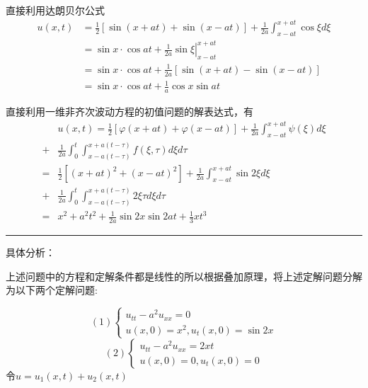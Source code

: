 \begin{questions}
\begin{solution}
直接利用达朗贝尔公式
$$
\begin{aligned}
u(x, t) & =\frac{1}{2}[\sin (x+a t)+\sin (x-a t)]+\frac{1}{2 a} \int_{x-a t}^{x+a t} \cos \xi d \xi \\
& =\sin x \cdot \cos a t+\left.\frac{1}{2 a} \sin \xi\right|_{x-a t} ^{x+a t} \\
& =\sin x \cdot \cos a t+\frac{1}{2 a}[\sin (x+a t)-\sin (x-a t)] \\
& =\sin x \cdot \cos a t+\frac{1}{a} \cos x \sin a t
\end{aligned}
$$
\end{solution}
\begin{solution}
    直接利用一维非齐次波动方程的初值问题的解表达式，有
$$
\begin{aligned}
& u(x, t)=\frac{1}{2}[\varphi(x+a t)+\varphi(x-a t)]+\frac{1}{2 a} \int_{x-a t}^{x+a t} \psi(\xi) d \xi \\
+ & \frac{1}{2 a} \int_{0}^{t} \int_{x-a(t-\tau)}^{x+a(t-\tau)} f(\xi, \tau) d \xi d \tau \\
= & \frac{1}{2}\left[(x+a t)^{2}+(x-a t)^{2}\right]+\frac{1}{2 a} \int_{x-a t}^{x+a t} \sin 2 \xi d \xi \\
+ & \frac{1}{2 a} \int_{0}^{t} \int_{x-a(t-\tau)}^{x+a(t-\tau)} 2 \xi \tau d \xi d \tau \\
= & x^{2}+a^{2} t^{2}+\frac{1}{2 a} \sin 2 x \sin 2 a t+\frac{1}{3} x t^{3}
\end{aligned}
$$

\hrule

具体分析：

上述问题中的方程和定解条件都是线性的所以根据叠加原理，将上述定解问题分解为以下两个定解问题:

$$(1) \left\{\begin{array}{l}u_{t t}-a^{2} u_{x x}=0 \\ u(x, 0)=x^{2}, u_{t}(x, 0)=\sin 2 x\end{array}\right. $$
$$(2) \left\{\begin{array}{l}u_{t t}-a^{2} u_{x x}=2 x t \\ u(x, 0)=0, u_{t}(x, 0)=0\end{array}\right. $$
令$u=u_{1}(x, t)+u_{2}(x, t)$


\end{solution}
\end{questions}
